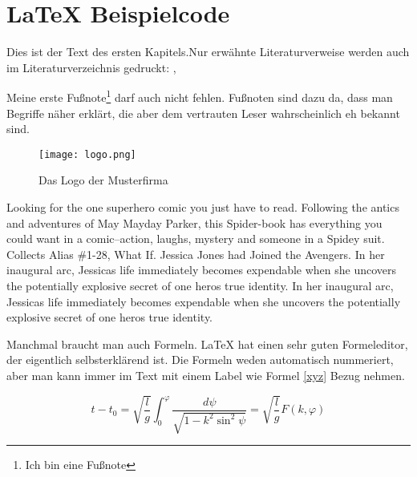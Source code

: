 
\chapter{LaTeX Beispielcode}
Dies ist der Text des ersten Kapitels.Nur erwähnte Literaturverweise werden auch im Literaturverzeichnis gedruckt: \cite[S.12 ff]{baumgartner:2002}, \cite[S.1-3]{dreyfus:1980}

Meine erste Fußnote\footnote{Ich bin eine Fußnote} darf auch nicht fehlen. Fußnoten sind dazu da, dass man Begriffe näher erklärt, die aber dem vertrauten Leser wahrscheinlich eh bekannt sind. 

\begin{figure}[h]
\centering
\texttt{[image: logo.png]}
\caption{Das Logo der Musterfirma\footnotemark}
\end{figure}



Looking for the one superhero comic you just have to read. Following the antics and adventures of May Mayday Parker, this Spider-book has everything you could want in a comic--action, laughs, mystery and someone in a Spidey suit. Collects Alias \#1-28, What If. Jessica Jones had Joined the Avengers. In her inaugural arc, Jessicas life immediately becomes expendable when she uncovers the potentially explosive secret of one heros true identity. In her inaugural arc, Jessicas life immediately becomes expendable when she uncovers the potentially explosive secret of one heros true identity.

Manchmal braucht man auch Formeln. LaTeX hat einen sehr guten Formeleditor, der eigentlich selbsterklärend ist. Die Formeln weden automatisch nummeriert, aber man kann immer im Text mit einem Label wie Formel \ref{xyz} Bezug nehmen.

\begin{equation}
t-t_{0}=\sqrt{\frac{l}{g}}\int_{0}^{\varphi}{\frac{d\psi}{\sqrt{1-k^{2}\sin^{2} {\psi}}}} = \sqrt{\frac{l}{g}} F(k,\varphi)
\label{xyz}
\end{equation}

